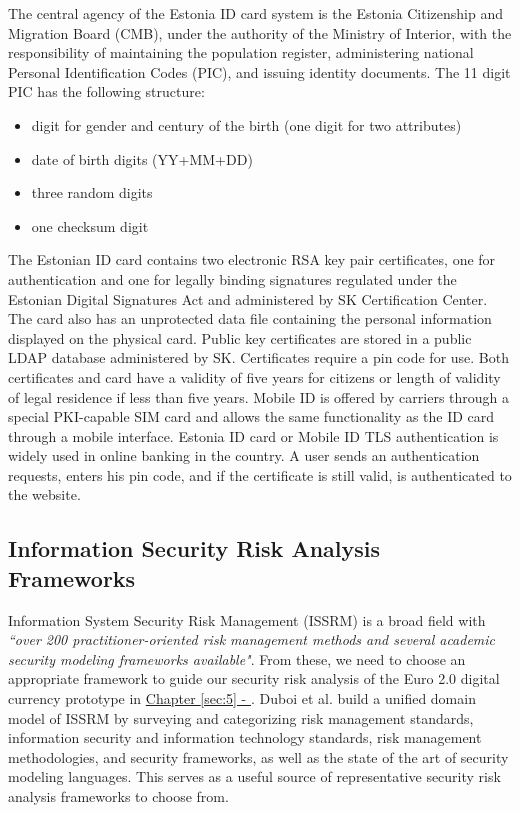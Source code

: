 \documentclass[a4paper,12pt]{article} %
\newcommand{\hyperchapterref}[1]{\hyperref[#1]{Chapter \ref{#1} - \nameref{#1}}}
\begin{document}
The central agency of the Estonia ID card system is the Estonia Citizenship and Migration Board (CMB), under the authority of the Ministry of Interior, with the responsibility of maintaining the population register, administering national Personal Identification Codes (PIC), and issuing identity documents. The 11 digit PIC has the following structure:

\begin{itemize}
	\item digit for gender and century of the birth (one digit for two attributes)
	\item date of birth digits (YY+MM+DD)
	\item three random digits
	\item one checksum digit
\end{itemize}

The Estonian ID card contains two electronic RSA key pair certificates, one for authentication and one for legally binding signatures regulated under the Estonian Digital Signatures Act and administered by SK Certification Center\cite{aboutSk2017}. The card also has an unprotected data file containing the personal information displayed on the physical card. Public key certificates are stored in a public LDAP database administered by SK\cite{skAboutLdap2017}. Certificates require a pin code for use. Both certificates and card have a validity of five years for citizens or length of validity of legal residence if less than five years. Mobile ID is offered by carriers through a special PKI-capable SIM card and allows the same functionality as the ID card through a mobile interface. Estonia ID card or Mobile ID TLS authentication is widely used in online banking in the country. A user sends an authentication requests, enters his pin code, and if the certificate is still valid, is authenticated to the website.

\subsection{Information Security Risk Analysis Frameworks} \label{ssec:2:issrmFramework}

Information System Security Risk Management (ISSRM) is a broad field with \textit{``over 200 practitioner-oriented risk management methods and several academic security modeling frameworks available"}\cite{Dubois2010}. From these, we need to choose an appropriate framework to guide our security risk analysis of the Euro 2.0 digital currency prototype in \hyperchapterref{sec:5}. Duboi et al. build a unified domain model of ISSRM by surveying and categorizing risk management standards, information security and information technology standards, risk management methodologies, and security frameworks, as well as the state of the art of security modeling languages. This serves as a useful source of representative security risk analysis frameworks to choose from.
\end{document}
